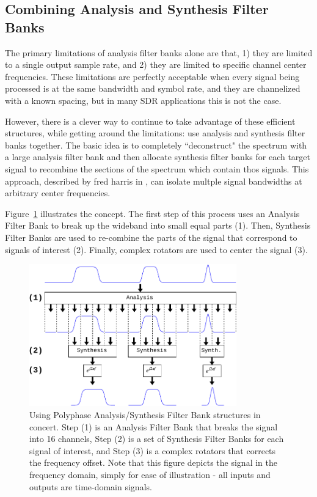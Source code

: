 \documentclass[12pt]{article}
\begin{document}
\subsection{Combining Analysis and Synthesis Filter Banks}
\label{sec:combine_analysis_synthesis}
The primary limitations of analysis filter banks alone are that, 1) they are
limited to a single output sample rate, and 2) they are limited to specific
channel center frequencies. These limitations are perfectly acceptable when
every signal being processed is at the same bandwidth and symbol rate, and they
are channelized with a known spacing, but in many SDR applications this is not
the case.

However, there is a clever way to continue to take advantage of these efficient
structures, while getting around the limitations: use analysis and synthesis
filter banks together. The basic idea is to completely ``deconstruct" the
spectrum with a large analysis filter bank and then allocate synthesis
filter banks for each target signal to recombine the sections of the spectrum
which contain thos signals. This approach, described by fred harris in
\cite{Harris2}, can isolate multple signal bandwidths at arbitrary center
frequencies.

Figure~\ref{fig:analysis_and_synthesis} illustrates the concept.
The first step of this process uses an Analysis
Filter Bank to break up the wideband into small equal parts (1). Then,
Synthesis Filter Banks are used to re-combine the parts of the signal that
correspond to signals of interest (2). Finally, complex rotators are used to
center the signal (3). 

\begin{figure}[h!]
    \begin{center}
    \includegraphics[width=0.8\textwidth]{polyphase}%
    \end{center}
    \caption{
Using Polyphase Analysis/Synthesis Filter Bank structures in concert. Step (1)
is an Analysis Filter Bank that breaks the signal into 16 channels, Step (2) is
a set of Synthesis Filter Banks for each signal of interest, and Step (3) is
a complex rotators that corrects the frequency offset. Note that this figure
depicts the signal in the frequency domain, simply for ease of illustration -
all inputs and outputs are time-domain signals.
    }
    \label{fig:analysis_and_synthesis}
\end{figure}
\end{document}

